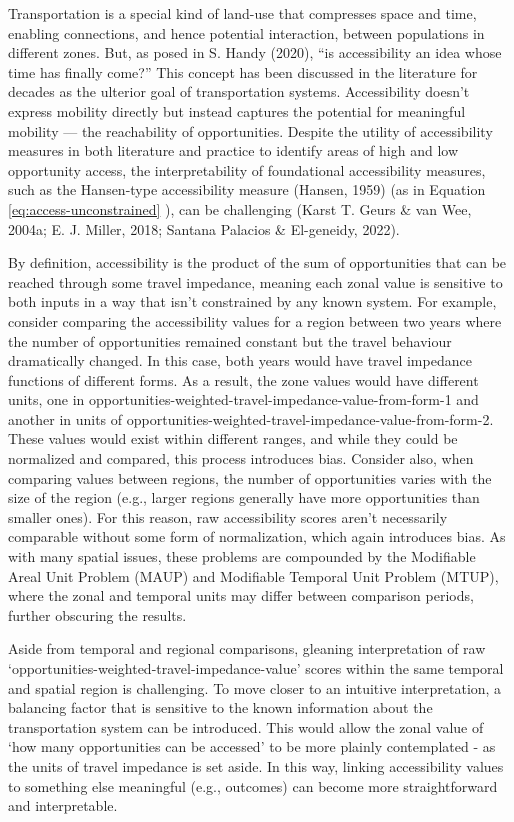 \documentclass[
11pt, %
oneside, %
english, %
singlespacing, %
]{macthesis} %
\begin{document}
Transportation is a special kind of land-use that compresses space and time, enabling connections, and hence potential interaction, between populations in different zones. But, as posed in S. Handy (2020), ``is accessibility an idea whose time has finally come?'' This concept has been discussed in the literature for decades as the ulterior goal of transportation systems. Accessibility doesn't express mobility directly but instead captures the potential for meaningful mobility --- the reachability of opportunities. Despite the utility of accessibility measures in both literature and practice to identify areas of high and low opportunity access, the interpretability of foundational accessibility measures, such as the Hansen-type accessibility measure (Hansen, 1959) (as in Equation \ref{eq:access-unconstrained} ), can be challenging (Karst T. Geurs \& van Wee, 2004a; E. J. Miller, 2018; Santana Palacios \& El-geneidy, 2022).

By definition, accessibility is the product of the sum of opportunities that can be reached through some travel impedance, meaning each zonal value is sensitive to both inputs in a way that isn't constrained by any known system. For example, consider comparing the accessibility values for a region between two years where the number of opportunities remained constant but the travel behaviour dramatically changed. In this case, both years would have travel impedance functions of different forms. As a result, the zone values would have different units, one in opportunities-weighted-travel-impedance-value-from-form-1 and another in units of opportunities-weighted-travel-impedance-value-from-form-2. These values would exist within different ranges, and while they could be normalized and compared, this process introduces bias. Consider also, when comparing values between regions, the number of opportunities varies with the size of the region (e.g., larger regions generally have more opportunities than smaller ones). For this reason, raw accessibility scores aren't necessarily comparable without some form of normalization, which again introduces bias. As with many spatial issues, these problems are compounded by the Modifiable Areal Unit Problem (MAUP) and Modifiable Temporal Unit Problem (MTUP), where the zonal and temporal units may differ between comparison periods, further obscuring the results.

Aside from temporal and regional comparisons, gleaning interpretation of raw `opportunities-weighted-travel-impedance-value' scores within the same temporal and spatial region is challenging. To move closer to an intuitive interpretation, a balancing factor that is sensitive to the known information about the transportation system can be introduced. This would allow the zonal value of `how many opportunities can be accessed' to be more plainly contemplated - as the units of travel impedance is set aside. In this way, linking accessibility values to something else meaningful (e.g., outcomes) can become more straightforward and interpretable.
\end{document}

